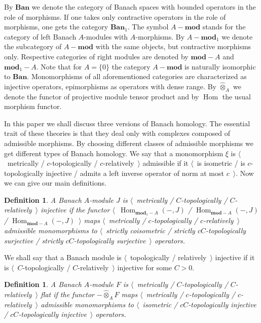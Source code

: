 \documentclass[12pt]{article}
\newtheorem{definition}[theorem]{Definition}
\newcommand{\projtens}{\mathbin{\widehat{\otimes}}}
\begin{document}
By $\mathbf{Ban}$ we denote the category of Banach spaces with bounded operators in the role of morphisms. If one takes only contractive operators in the role of morphisms, one gets the category $\mathbf{Ban}_1$. The symbol $A-\mathbf{mod}$ stands for the category of left Banach $A$-modules with $A$-morphisms. By $A-\mathbf{mod}_1$ we denote the subcategory of $A-\mathbf{mod}$ with the same objects, but contractive morphisms only. Respective categories of right modules are denoted by $\mathbf{mod}-A$ and $\mathbf{mod}_1-A$. Note that for $A=\{0\}$ the category $A-\mathbf{mod}$ is naturally isomorphic to $\mathbf{Ban}$. Monomorphisms of all aforementioned categories are characterized as injective operators, epimorphisms as operators with dense range. By $\projtens_A$ we denote the functor of projective module tensor product and by $\operatorname{Hom}$ the usual morphism functor.

In this paper we shall discuss three versions of Banach homology. The essential trait of these theories is that they deal only with complexes composed of admissible morphisms. By choosing different classes of admissible morphisms we get different types of Banach homology. We say that a monomorphism $\xi$ is $\langle$~metrically / $c$-topologically / $c$-relatively~$\rangle$ admissible if it $\langle$~is isometric / is $c$-topologically injective / admits a left inverse operator of norm at most $c$~$\rangle$. Now we can give our main definitions.

\begin{definition} A Banach $A$-module $J$ is \emph{$\langle$~metrically / $C$-topologically / $C$-relatively~$\rangle$ injective} if the functor $\langle$~$\operatorname{Hom}_{\mathbf{mod}_1-A}(-,J)$ / $\operatorname{Hom}_{\mathbf{mod}-A}(-,J)$ / $\operatorname{Hom}_{\mathbf{mod}-A}(-,J)$~$\rangle$ maps $\langle$~metrically / $c$-topologically / $c$-relatively~$\rangle$ admissible monomorphisms to $\langle$~strictly coisometric / strictly $cC$-topologically surjective / strictly $cC$-topologically surjective~$\rangle$ operators.
\end{definition}

We shall say that a Banach module is $\langle$~topologically / relatively~$\rangle$ injective if it is $\langle$~$C$-topologically / $C$-relatively~$\rangle$ injective for some $C>0$.

\begin{definition} A Banach $A$-module $F$ is \emph{$\langle$~metrically / $C$-topologically / $C$-relatively~$\rangle$ flat} if the functor $-\projtens_A F$ maps $\langle$~metrically / $c$-topologically / $c$-relatively~$\rangle$ admissible monomorphisms to $\langle$~isometric / $cC$-topologically injective / $cC$-topologically injective~$\rangle$ operators.
\end{definition}
\end{document}
